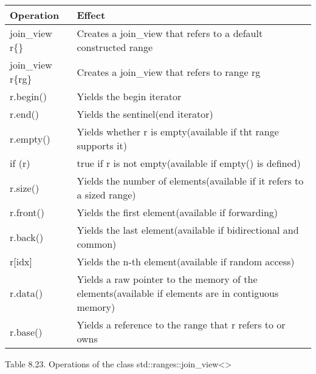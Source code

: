 \begin{longtable}[c]{|l|l|}
\hline
\textbf{Operation} & \textbf{Effect}                                                        \\ \hline
\endfirsthead
%
\endhead
%
join\_view r\{\}   & Creates a join\_view that refers to a default constructed range        \\ \hline
join\_view r\{rg\} & Creates a join\_view that refers to range rg                           \\ \hline
r.begin()          & Yields the begin iterator                                              \\ \hline
r.end()            & Yields the sentinel(end iterator)                                      \\ \hline
r.empty()          & Yields whether r is empty(available if tht range supports it)          \\ \hline
if (r)             & true if r is not empty(available if empty() is defined)                \\ \hline
r.size()           & Yields the number of elements(available if it refers to a sized range) \\ \hline
r.front()          & Yields the first element(available if forwarding)                      \\ \hline
r.back()           & Yields the last element(available if bidirectional and common)         \\ \hline
r{[}idx{]}         & Yields the n-th element(available if random access)                    \\ \hline
r.data() & Yields a raw pointer to the memory of the elements(available if elements are in contiguous memory) \\ \hline
r.base()           & Yields a reference to the range that r refers to or owns               \\ \hline
\end{longtable}

\begin{center}
Table 8.23. Operations of the class std::ranges::join\_view<>
\end{center}













